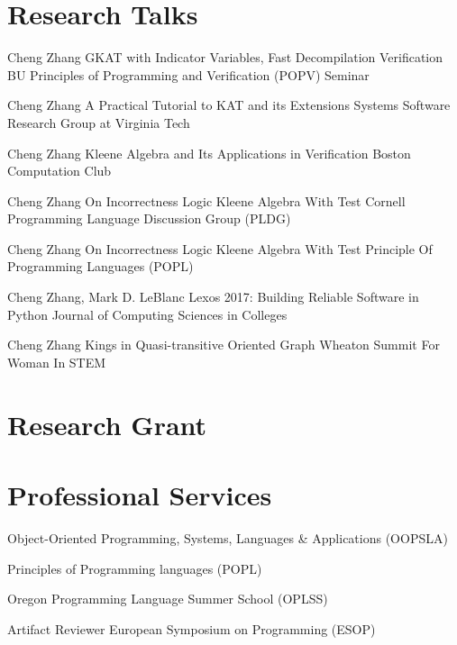 \documentclass[10pt]{moderncv}        %
\let\oldsection=\section
\renewcommand{\section}{%
  \needspace{\baselineskip}
  \oldsection
}
\begin{document}
\section{Research Talks}

{Cheng Zhang}
{GKAT with Indicator Variables, Fast Decompilation Verification}
{BU Principles of Programming and Verification (POPV) Seminar}
{}{}

{Cheng Zhang}
{A Practical Tutorial to KAT and its Extensions}
{Systems Software Research Group at Virginia Tech}
{}{}

{Cheng Zhang}
{Kleene Algebra and Its Applications in Verification}
{Boston Computation Club}
{}{}

{Cheng Zhang}
{On Incorrectness Logic Kleene Algebra With Test}
{Cornell Programming Language Discussion Group (PLDG)}
{}{}

{Cheng Zhang}
{On Incorrectness Logic Kleene Algebra With Test}
{Principle Of Programming Languages (POPL)}
{}{}

{Cheng Zhang, Mark D. LeBlanc}
{Lexos 2017: Building Reliable Software in Python}
{Journal of Computing Sciences in Colleges}
{}{}

{Cheng Zhang}
{Kings in Quasi-transitive Oriented Graph}
{Wheaton Summit For Woman In STEM}
{}{}

\section{Research Grant}



\section{Professional Services}

{Object-Oriented Programming, Systems, Languages \& Applications (OOPSLA)}{}{}{}

{Principles of Programming languages (POPL)}{}{}{}

{Oregon Programming Language Summer School (OPLSS)}{}{}{}

{Artifact Reviewer}
{European Symposium on Programming (ESOP)}{}{}{}
\end{document}
